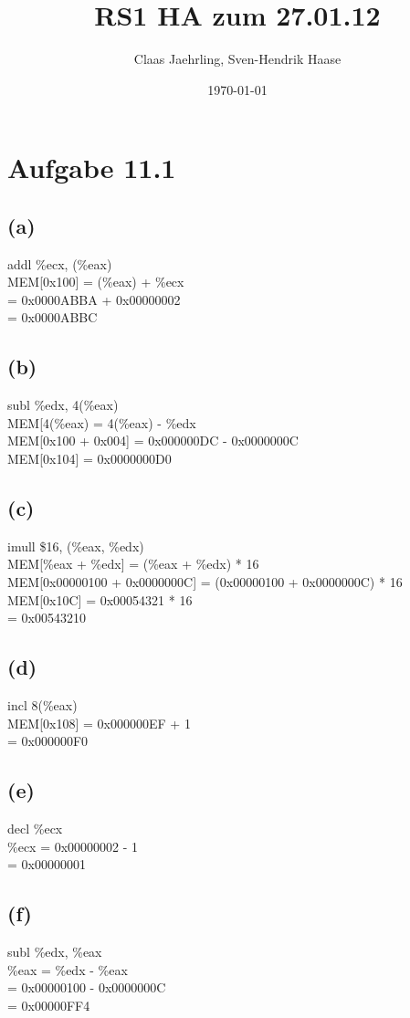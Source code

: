 \documentclass[12pt]{article}
\author{Claas Jaehrling, Sven-Hendrik Haase}
\title{RS1 HA zum 27.01.12}
\date{\today}
\begin{document}
\setcounter{secnumdepth}{0}
\maketitle

\section{Aufgabe 11.1}
\subsection{(a)}
addl \%ecx, (\%eax) \\
MEM[0x100] = (\%eax) + \%ecx \\
= 0x0000ABBA + 0x00000002 \\
= 0x0000ABBC
\subsection{(b)}
subl \%edx, 4(\%eax) \\
MEM[4(\%eax) = 4(\%eax) - \%edx \\
MEM[0x100 + 0x004] = 0x000000DC - 0x0000000C \\
MEM[0x104] = 0x0000000D0
\subsection{(c)}
imull \$16, (\%eax, \%edx) \\
MEM[\%eax + \%edx] = (\%eax + \%edx) * 16 \\
MEM[0x00000100 + 0x0000000C] = (0x00000100 + 0x0000000C) * 16 \\
MEM[0x10C] = 0x00054321 * 16 \\
= 0x00543210
\subsection{(d)}
incl 8(\%eax) \\
MEM[0x108] = 0x000000EF + 1 \\
= 0x000000F0
\subsection{(e)}
decl \%ecx \\
\%ecx = 0x00000002 - 1 \\
= 0x00000001
\subsection{(f)}
subl \%edx, \%eax \\
\%eax = \%edx - \%eax \\
= 0x00000100 - 0x0000000C \\
= 0x00000FF4
\end{document}
